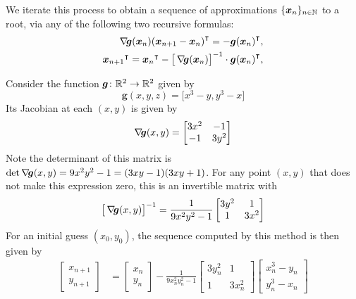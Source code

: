 We iterate this process to obtain a sequence of approximations $\{ \boldsymbol{x}_n \}_{n \in \mathbb{N}}$ to a root, via any of the following two recursive formulas:
\begin{equation}\label{equation:NewtonMethod}
\begin{split}
\mathop{\nabla\! {\boldsymbol{g}}}(\boldsymbol{x}_n) {(\boldsymbol{x}_{n+1}-\boldsymbol{x}_n)}^\intercal = -{\boldsymbol{g}(\boldsymbol{x}_n)}^\intercal, \\
{\boldsymbol{x}_{n+1}}^\intercal = {\boldsymbol{x}_n}^\intercal - \big[ \mathop{\nabla\! {\boldsymbol{g}}}(\boldsymbol{x}_n) \big]^{-1} \cdot {\boldsymbol{g}(\boldsymbol{x}_n)}^\intercal,
\end{split}
\end{equation}

\begin{example}\label{example:preNewton4poly4}
Consider the function $\boldsymbol{g}\colon \mathbb{R}^2 \to \mathbb{R}^2$ given by
\begin{equation*}
\boldsymbol{g}(x,y,z) = \big[ x^3-y, y^3-x \big]
\end{equation*}
Its Jacobian at each $(x,y)$ is given by
\begin{equation*}
\mathop{\nabla\! {\boldsymbol{g}}}(x,y) = \begin{bmatrix} 3x^2 & -1 \\ -1 & 3y^2 \end{bmatrix}
\end{equation*}
Note the determinant of this matrix is $\det \mathop{\nabla\! {\boldsymbol{g}}}(x,y) = 9x^2y^2-1 = (3xy-1)(3xy+1)$.  For any point $(x,y)$ that does not make this expression zero, this is an invertible matrix with 
\begin{equation*}
\big[ \mathop{\nabla\! {\boldsymbol{g}}}(x,y)\big]^{-1} = \frac{1}{9x^2y^2-1}\begin{bmatrix} 3y^2 & 1 \\ 1 & 3x^2 \end{bmatrix}
\end{equation*}
For an initial guess $(x_0, y_0)$, the sequence computed by this method is then given by
\begin{align*}
\begin{bmatrix} x_{n+1} \\ y_{n+1} \end{bmatrix} &= \begin{bmatrix} x_n \\ y_n \end{bmatrix} -\frac{1}{9 x_n^2 y_n^2-1}\begin{bmatrix} 3y_n^2 & 1 \\ 1 & 3x_n^2 \end{bmatrix} \begin{bmatrix} x_n^3-y_n \\ y_n^3-x_n \end{bmatrix} \\

\end{align*}
\end{example}
